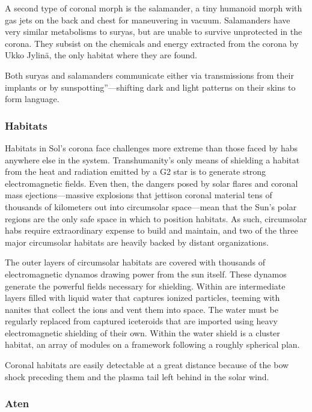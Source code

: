A second type of coronal morph is the salamander, 
a tiny humanoid morph with gas jets on the back and 
chest for maneuvering in vacuum. Salamanders have 
very similar metabolisms to suryas, but are unable to 
survive unprotected in the corona. They subsist on the 
chemicals and energy extracted from the corona by 
Ukko Jylinä, the only habitat where they are found.

Both suryas and salamanders communicate either 
via transmissions from their implants or by sunspotting''—shifting
dark and light patterns on their skins
to form language.

\subsubsection{Habitats}

Habitats in Sol's corona face challenges more extreme 
than those faced by habs anywhere else in the system. 
Transhumanity's only means of shielding a habitat 
from the heat and radiation emitted by a G2 star is to 
generate strong electromagnetic fields. Even then, the 
dangers posed by solar flares and coronal mass ejections—massive
explosions that jettison coronal material
tens of thousands of kilometers out into circumsolar 
space—mean that the Sun's polar regions are the only 
safe space in which to position habitats. As such, circumsolar
habs require extraordinary expense to build
and maintain, and two of the three major circumsolar 
habitats are heavily backed by distant organizations.

The outer layers of circumsolar habitats are covered 
with thousands of electromagnetic dynamos drawing 
power from the sun itself. These dynamos generate 
the powerful fields necessary for shielding. Within 
are intermediate layers filled with liquid water that 
captures ionized particles, teeming with nanites that 
collect the ions and vent them into space. The water 
must be regularly replaced from captured iceteroids 
that are imported using heavy electromagnetic shielding
of their own. Within the water shield is a cluster
habitat, an array of modules on a framework following
a roughly spherical plan.

Coronal habitats are easily detectable at a great distance
because of the bow shock preceding them and
the plasma tail left behind in the solar wind.

\subsubsection{Aten}

